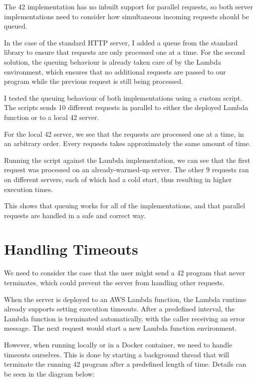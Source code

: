 The 42 implementation has no inbuilt support for parallel requests, so both server implementations need to consider how simultaneous incoming requests should be queued.

In the case of the standard HTTP server, I added a queue from the standard library to ensure that requests are only processed one at a time. For the second solution, the queuing behaviour is already taken care of by the Lambda environment, which ensures that no additional requests are passed to our program while the previous request is still being processed.

I tested the queuing behaviour of both implementations using a custom script. The scripts sends 10 different requests in parallel to either the deployed Lambda function or to a local 42 server.

For the local 42 server, we see that the requests are processed one at a time, in an arbitrary order. Every requests takes approximately the same amount of time.


Running the script against the Lambda implementation, we can see that the first request was processed on an already-warmed-up server. The other 9 requests ran on different servers, each of which had a cold start, thus resulting in higher execution times.


This shows that queuing works for all of the implementations, and that parallel requests are handled in a safe and correct way.

\section{Handling Timeouts}

We need to consider the case that the user might send a 42 program that never terminates, which could prevent the server from handling other requests.

When the server is deployed to an AWS Lambda function, the Lambda runtime already supports setting execution timeouts. After a predefined interval, the Lambda function is terminated automatically, with the caller receiving an error message. The next request would start a new Lambda function environment.

However, when running locally or in a Docker container, we need to handle timeouts ourselves. This is done by starting a background thread that will terminate the running 42 program after a predefined length of time. Details can be seen in the diagram below:

